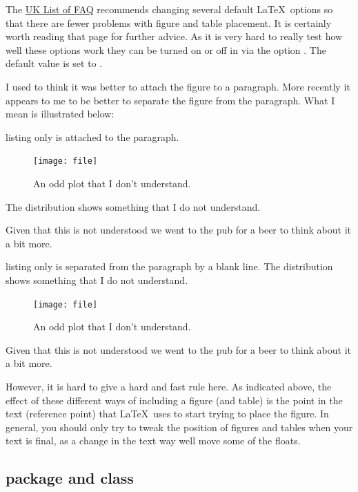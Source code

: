 The
\href{http://www.tex.ac.uk/cgi-bin/texfaq2html?label=floats}{UK List of FAQ}
recommends changing several default \LaTeX\ options so that there are fewer problems
with figure and table placement.
It is certainly worth reading that page for further advice.
As it is very hard to really test how well these options work
they can be turned on or off in  via the option .
The default value is set to .

I used to think it was better to attach the figure to a paragraph.
More recently it appears to me to be better to separate the figure
from the paragraph.
What I mean is illustrated below:
\begin{tcblisting}{listing only}
 is attached to the paragraph.
%
\begin{figure}[htbp]
  \centering
  \texttt{[image: file]}
  \caption{An odd plot that I don't understand.}
  \label{fig:funny1}
\end{figure}
%
The distribution shows something that I do not understand.

Given that this is not understood we went to the pub for a beer to
think about it a bit more.
\end{tcblisting}

\begin{tcblisting}{listing only}
 is separated from the paragraph by a blank line.
The distribution shows something that I do not understand.

\begin{figure}[htbp]
  \centering
  \texttt{[image: file]}
  \caption{An odd plot that I don't understand.}
  \label{fig:funny2}
\end{figure}

Given that this is not understood we went to the pub for a beer to
think about it a bit more.
\end{tcblisting}

However, it is hard to give a hard and fast rule here.
As indicated above, the effect of these different ways of including a figure (and table) is the point in the text (reference point) that \LaTeX\ uses to start trying to place the figure.
In general, you should only try to tweak the position of figures and tables when your text is final,
as a change in the text way well move some of the floats.

\subsection{ package and class}%
\label{sec:fig:standalone}

